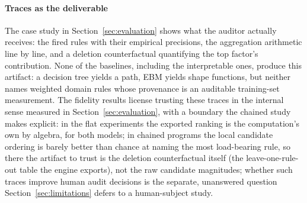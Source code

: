 \paragraph{Traces as the deliverable} The case study in
Section~\ref{sec:evaluation} shows what the auditor actually receives:
the fired rules with their empirical precisions, the aggregation
arithmetic line by line, and a deletion counterfactual quantifying the
top factor's contribution. None of the baselines, including the
interpretable ones, produce this artifact: a decision tree yields a
path, EBM yields shape functions, but neither names weighted domain
rules whose provenance is an auditable training-set measurement. The
fidelity results license trusting these traces in the internal sense
measured in Section~\ref{sec:evaluation}, with a boundary the chained
study makes explicit: in the flat experiments the
exported ranking is the computation's own by algebra, for both
models; in chained programs the local candidate ordering is barely
better than chance at naming the most load-bearing rule, so there the
artifact to trust is the deletion counterfactual itself (the
leave-one-rule-out table the engine exports), not the raw candidate
magnitudes; whether such traces improve human audit decisions is the
separate, unanswered question Section~\ref{sec:limitations} defers to
a human-subject study.
